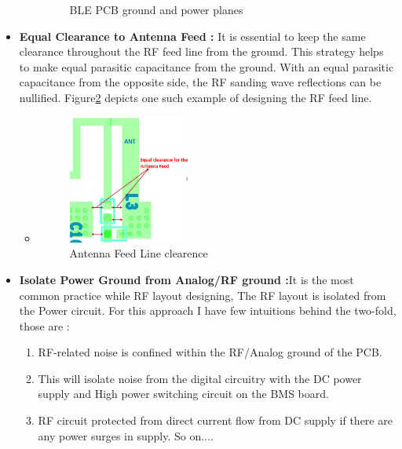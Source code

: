\begin{itemize}
\begin{itemize}
\begin{figure}[h]
				\caption{BLE PCB ground and power planes}
				\centering
				\label{fig:BLE_PCB_ground_and_power_planes}
			\end{figure}
		\end{itemize}
	\item \textbf{Equal Clearance to Antenna Feed :} It is essential to keep the same clearance throughout the RF feed line from the ground. This strategy helps to make equal parasitic capacitance from the ground. With an equal parasitic capacitance from the opposite side, the RF sanding wave reflections can be nullified. Figure\ref{fig:Antenna_Feed_clearence} depicts one such example of designing the RF feed line.
		\begin{itemize}
			\item \begin{figure}[h]
			    \centering
				\includegraphics[width=0.4\textwidth]{Chap03/Figures/Antenna_Feed.PNG}
					\caption{Antenna Feed Line clearence}
					\label{fig:Antenna_Feed_clearence}
				\end{figure}
		\end{itemize}
	\item \textbf{ Isolate Power Ground from Analog/RF ground :}It is the most common practice while RF layout designing, The RF layout is isolated from the Power circuit. For this approach I have few intuitions behind the two-fold, those are :
		\begin{enumerate}\label{en:RFGND_isolation_benifits}
			\item RF-related noise is confined within the RF/Analog ground of the PCB.
			\item This will isolate noise from the digital circuitry with the DC power supply and High power switching circuit on the BMS board.
			\item RF circuit protected from direct current flow from DC supply if there are any power surges in supply. So on....
		\end{enumerate}
	    \begin{figure}[h]

\end{figure}
\end{itemize}
